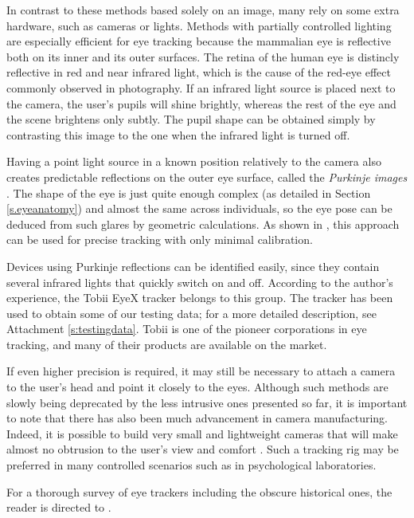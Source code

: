 In contrast to these methods based solely on an image, many rely on some extra hardware, such as cameras or lights.
Methods with partially controlled lighting are especially efficient for eye tracking because the mammalian eye is reflective both on its inner and its outer surfaces.
The retina of the human eye is distincly reflective in red and near infrared light, which is the cause of the red-eye effect commonly observed in photography.
If an infrared light source is placed next to the camera, the user's pupils will shine brightly, whereas the rest of the eye and the scene brightens only subtly.
The pupil shape can be obtained simply by contrasting this image to the one when the infrared light is turned off.

Having a point light source in a known position relatively to the camera also creates predictable reflections on the outer eye surface, called the \textit{Purkinje images} \cite{hansen10}.
The shape of the eye is just quite enough complex (as detailed in Section \ref{s.eyeanatomy}) and almost the same across individuals, so the eye pose can be deduced from such glares by geometric calculations.
As shown in \cite{villanueva08}, this approach can be used for precise tracking with only minimal calibration.

Devices using Purkinje reflections can be identified easily, since they contain several infrared lights that quickly switch on and off.
According to the author's experience, the Tobii EyeX tracker \cite{tobii} belongs to this group.
The tracker has been used to obtain some of our testing data; for a more detailed description, see Attachment \ref{s:testingdata}.
Tobii is one of the pioneer corporations in eye tracking, and many of their products are available on the market.

If even higher precision is required, it may still be necessary to attach a camera to the user's head and point it closely to the eyes.
Although such methods are slowly being deprecated by the less intrusive ones presented so far, it is important to note that there has also been much advancement in camera manufacturing.
Indeed, it is possible to build very small and lightweight cameras that will make almost no obtrusion to the user's view and comfort \cite{pupil,kassner14}.
Such a tracking rig may be preferred in many controlled scenarios such as in psychological laboratories.

For a thorough survey of eye trackers including the obscure historical ones, the reader is directed to \cite{hansen10}.

